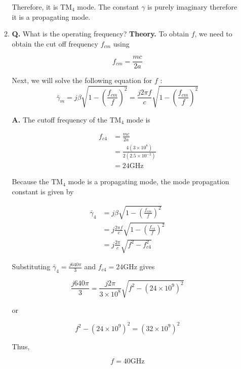 \documentclass[main.tex]{subfiles}
\begin{document}
\begin{enumerate}
\begin{enumerate}
        Therefore, it is $\mathrm{TM_4}$ mode. The constant $\gamma$ is purely imaginary therefore it is a propagating mode.
        
        \item \textbf{Q.} What is the operating frequency? \textbf{Theory.} To obtain $f$, we need to obtain the cut off frequency $f_{c m}$ using
        
        $$
        f_{cm}=\frac{mc}{2 a}
        $$
        
        Next, we will solve the following equation for $f$ :
        $$
        \bar{\gamma}_m=j \beta \sqrt{1-\left(\frac{f_{c m}}{f}\right)^2}=\frac{j 2 \pi f}{c} \sqrt{1-\left(\frac{f_{c m}}{f}\right)^2}
        $$
        
        \textbf{A.} The cutoff frequency of the $\mathrm{TM}_4$ mode is
        
        $$
        \begin{aligned}
        f_{c 4} & =\frac{m c}{2 a} \\
        & =\frac{4\left(3 \times 10^8\right)}{2\left(2.5 \times 10^{-2}\right)} \\
        & =24 \mathrm{GHz}
        \end{aligned}
        $$

        Because the $\mathrm{TM}_4$ mode is a propagating mode, the mode propagation constant is given by
        
        $$
        \begin{aligned}
        \bar{\gamma}_4 & =j \beta \sqrt{1-\left(\frac{f_{c m}}{f}\right)^2} \\
        & =j \frac{2 \pi f}{c} \sqrt{1-\left(\frac{f_{c 4}}{f}\right)^2} \\
        & =j \frac{2 \pi}{c} \sqrt{f^2-f_{c 4}^2}
        \end{aligned}
        $$

        Substituting $\bar{\gamma}_4=\frac{j 640 \pi}{3}$ and $f_{c 4}=24 \mathrm{GHz}$ gives
        
        $$
        \frac{j 640 \pi}{3}=\frac{j 2 \pi}{3 \times 10^8} \sqrt{f^2-\left(24 \times 10^9\right)^2}
        $$
        
        or
        
        $$
        f^2-\left(24 \times 10^9\right)^2=\left(32 \times 10^9\right)^2
        $$
        
        Thus,
        
        $$
        f=40 \mathrm{GHz}
        $$
        

\end{enumerate}
\end{enumerate}
\end{document}
